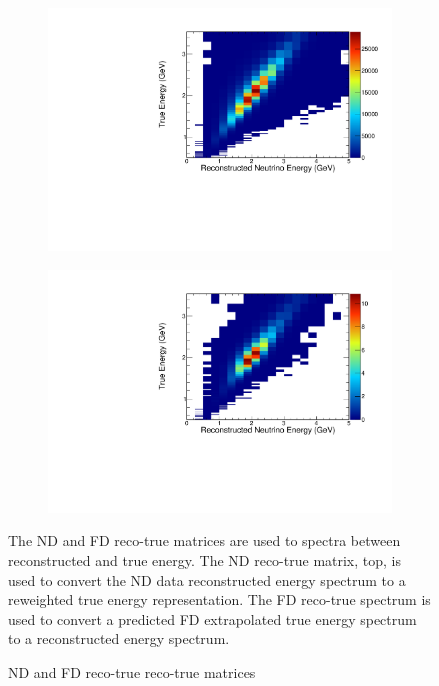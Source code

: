 \begin{figure}
\begin{center}
  \begin{subfigure}[b]{0.8\textwidth}
    \centering
    \includegraphics[width=\textwidth]{figures/plots/extrap/NDRecoToTrue.pdf}
  \end{subfigure}

  \begin{subfigure}[b]{0.8\textwidth}
    \centering
    \includegraphics[width=\textwidth]{figures/plots/extrap/FDTrueToReco.pdf}
  \end{subfigure}

\end{center}
\caption{ND and FD reco-true reco-true matrices}{
The ND and FD reco-true matrices are used to spectra between
reconstructed and true energy.
The ND reco-true matrix, top, is used to convert the ND data reconstructed
energy spectrum to a reweighted true energy representation.
The FD reco-true spectrum is used to convert a predicted FD extrapolated
true energy spectrum to a reconstructed energy spectrum.
}
\label{extrapRecoTrue}
\end{figure}



